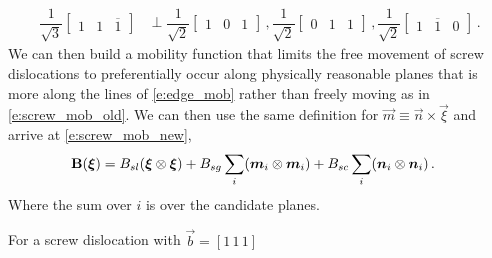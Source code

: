 \begin{subequations}
\begin{align}
		\dfrac{1}{\sqrt{3}}
		\begin{bmatrix}
			1 & 1 & \overline{1}
		\end{bmatrix} &\perp 	\dfrac{1}{\sqrt{2}}
								\begin{bmatrix}
									1 & 0 & 1
								\end{bmatrix}\,,
								\dfrac{1}{\sqrt{2}}
								\begin{bmatrix}
									0 & 1 & 1
								\end{bmatrix}\,,
								\dfrac{1}{\sqrt{2}}
								\begin{bmatrix}
									1 & \overline{1} & 0
								\end{bmatrix}\,.					
	\end{align}
\end{subequations}
We can then build a mobility function that limits the free movement of screw dislocations to preferentially occur along physically reasonable planes that is more along the lines of \cref{e:edge_mob} rather than freely moving as in \cref{e:screw_mob_old}. We can then use the same definition for $ \vec{m} \equiv \vec{n} \times \vec{\xi} $ and arrive at \cref{e:screw_mob_new},
\begin{align}\label{e:screw_mob_new}
	\mtx{B}(\vec{\xi}) &= B_{sl} (\vec{\xi} \otimes \vec{\xi}) + B_{sg} \sum\limits_{i}(\vec{m}_{i} \otimes \vec{m}_{i}) + B_{sc} \sum\limits_{i}(\vec{n}_{i} \otimes \vec{n}_{i})\,.
\end{align}
Where the sum over $ i $ is over the candidate planes.

For a screw dislocation with $ \vec{b} = [1\,1\,1] $

